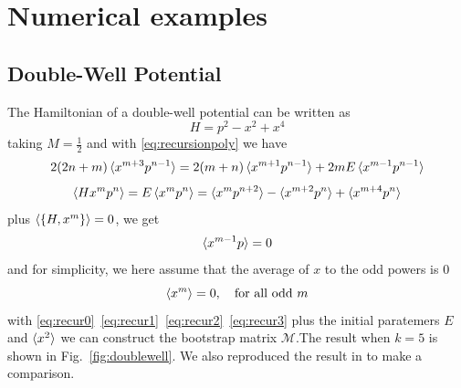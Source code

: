 \documentclass[aps, preprint,amsmath, amssymb]{revtex4-2}
\begin{document}
\section{Numerical examples}
\subsection {Double-Well Potential}
The Hamiltonian of a double-well potential can be written as
\begin{equation}
    H = p^2 - x^2 + x^4
\end{equation}
taking $M = \frac12$ and with \eqref{eq:recursionpoly} we have
\begin{equation}
    2(2n + m)\braket{x^{m + 3} p^{n - 1}} = 2(m + n)\braket{x^{m + 1} p^{n - 1}} + 2mE\braket{x^{m - 1} p^{n - 1}} \label{eq:recur0}
\end{equation}
\begin{equation}
    \braket{Hx^m p^n} = E\braket{x^m p^n} = \braket{x^m p^{n + 2}} - \braket{x^{m + 2} p^n} + \braket{x^{m + 4} p^n} \label{eq:recur1}
\end{equation}
plus $\braket{\{H, x^m\}} = 0$, we get
\begin{equation}
    \braket{x^{m - 1} p} = 0 \label{eq:recur2}
\end{equation}
and for simplicity, we here assume that the average of $x$ to the odd powers is $0$
\begin{equation}
    \braket{x^m} = 0,\ \ \ \text{for all odd}\ m \label{eq:recur3}
\end{equation}
with \eqref{eq:recur0}~\eqref{eq:recur1}~\eqref{eq:recur2}~\eqref{eq:recur3} plus the initial paratemers $E$ and $\braket{x^2}$ we can construct the bootstrap matrix $\bm{\mathcal{M}}$.The result when $k = 5$ is shown in Fig.~\ref{fig:doublewell}. We also reproduced the result in \cite{Nakayama_2022} to make a comparison.
\end{document}

